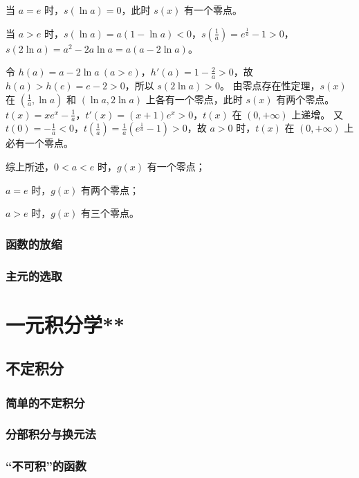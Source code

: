 \begin{jie}
    当 $a = e$ 时，$s(\ln a) = 0$，此时 $s(x)$ 有一个零点。
    
    当 $a > e$ 时，$s(\ln a) = a(1 - \ln a) < 0$，$s\left(\frac{1}{a}\right) = e^{\frac{1}{a}} - 1 > 0$，$s(2\ln a) = a^2 - 2a\ln a = a(a - 2\ln a)$。
    
    令 $h(a) = a - 2\ln a \ (a > e)$，$h'(a) = 1 - \frac{2}{a} > 0$，故 $h(a) > h(e) = e - 2 > 0$，所以 $s(2\ln a) > 0$。
    由零点存在性定理，$s(x)$ 在 $\left(\frac{1}{a}, \ln a\right)$ 和 $(\ln a, 2\ln a)$ 上各有一个零点，此时 $s(x)$ 有两个零点。
     $t(x) = xe^x - \frac{1}{a}$，$t'(x) = (x + 1)e^x > 0$，$t(x)$ 在 $(0, +\infty)$ 上递增。
    又 $t(0) = -\frac{1}{a} < 0$，$t\left(\frac{1}{a}\right) = \frac{1}{a}\left(e^{\frac{1}{a}} - 1\right) > 0$，故 $a > 0$ 时，$t(x)$ 在 $(0, +\infty)$ 上必有一个零点。
    
    综上所述，$0 < a < e$ 时，$g(x)$ 有一个零点；
    
    $a = e$ 时，$g(x)$ 有两个零点；
    
    $a > e$ 时，$g(x)$ 有三个零点。
    
    
\end{jie}
    



\clearpage
\subsection{函数的放缩}
\clearpage
\subsection{主元的选取}
\clearpage



\chapter{一元积分学**}
\section{不定积分}
\subsection{简单的不定积分}
\clearpage
\subsection{分部积分与换元法}
\clearpage
\subsection{“不可积”的函数}
\clearpage

